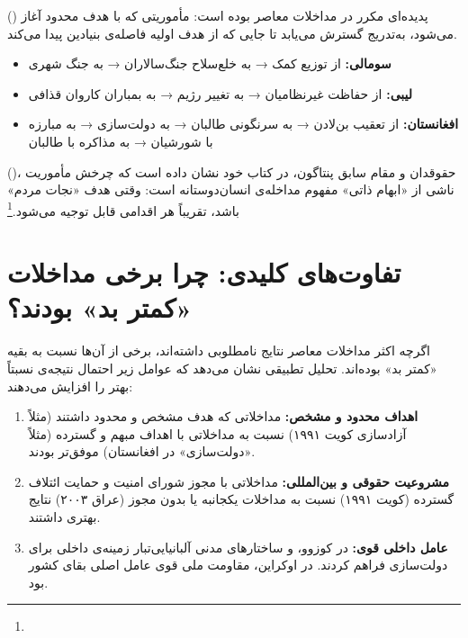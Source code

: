 { () پدیده‌ای مکرر در مداخلات معاصر بوده است: مأموریتی که با هدف محدود آغاز می‌شود، به‌تدریج گسترش می‌یابد تا جایی که از هدف اولیه فاصله‌ی بنیادین پیدا می‌کند.

\begin{itemize}
\item \textbf{سومالی:} از توزیع کمک → به خلع‌سلاح جنگ‌سالاران → به جنگ شهری
\item \textbf{لیبی:} از حفاظت غیرنظامیان → به تغییر رژیم → به بمباران کاروان قذافی
\item \textbf{افغانستان:} از تعقیب بن‌لادن → به سرنگونی طالبان → به دولت‌سازی → به مبارزه با شورشیان → به مذاکره با طالبان
\end{itemize}

 ()، حقوقدان و مقام سابق پنتاگون، در کتاب خود نشان داده است که چرخش مأموریت ناشی از «ابهام ذاتی» مفهوم مداخله‌ی انسان‌دوستانه است: وقتی هدف «نجات مردم» باشد، تقریباً هر اقدامی قابل توجیه می‌شود.\footnote{}


\section{تفاوت‌های کلیدی: چرا برخی مداخلات «کمتر بد» بودند؟}
\label{sec:ch10-differences}

اگرچه اکثر مداخلات معاصر نتایج نامطلوبی داشته‌اند، برخی از آن‌ها نسبت به بقیه «کمتر بد» بوده‌اند. تحلیل تطبیقی نشان می‌دهد که عوامل زیر احتمال نتیجه‌ی نسبتاً بهتر را افزایش می‌دهند:

\begin{tcolorbox}[successbox, title={عوامل نسبی «موفقیت» در مداخلات}]
\begin{enumerate}
\item \textbf{اهداف محدود و مشخص:} مداخلاتی که هدف مشخص و محدود داشتند (مثلاً آزادسازی کویت ۱۹۹۱) نسبت به مداخلاتی با اهداف مبهم و گسترده (مثلاً «دولت‌سازی» در افغانستان) موفق‌تر بودند.

\item \textbf{مشروعیت حقوقی و بین‌المللی:} مداخلاتی با مجوز شورای امنیت و حمایت ائتلاف گسترده (کویت ۱۹۹۱) نسبت به مداخلات یکجانبه یا بدون مجوز (عراق ۲۰۰۳) نتایج بهتری داشتند.

\item \textbf{عامل داخلی قوی:} در کوزوو،  و ساختارهای مدنی آلبانیایی‌تبار زمینه‌ی داخلی برای دولت‌سازی فراهم کردند. در اوکراین، مقاومت ملی قوی عامل اصلی بقای کشور بود.


\end{enumerate}
\end{tcolorbox}}
